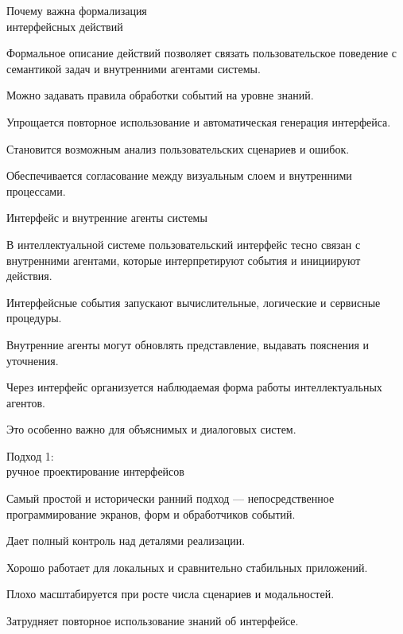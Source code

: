 \begin{frame}{Почему важна формализация\\ интерфейсных действий}
	\topline
	\justifying

	Формальное описание действий позволяет связать пользовательское поведение с семантикой задач и внутренними агентами системы.
	
	\begin{textitemize}
		\item Можно задавать правила обработки событий на уровне знаний.
		\item Упрощается повторное использование и автоматическая генерация интерфейса.
		\item Становится возможным анализ пользовательских сценариев и ошибок.
		\item Обеспечивается согласование между визуальным слоем и внутренними процессами.
	\end{textitemize}
\end{frame}

\begin{frame}{Интерфейс и внутренние агенты системы}
	\topline
	\justifying

	В интеллектуальной системе пользовательский интерфейс тесно связан с внутренними агентами, которые интерпретируют события и инициируют действия.
	
	\begin{textitemize}
		\item Интерфейсные события запускают вычислительные, логические и сервисные процедуры.
		\item Внутренние агенты могут обновлять представление, выдавать пояснения и уточнения.
		\item Через интерфейс организуется наблюдаемая форма работы интеллектуальных агентов.
		\item Это особенно важно для объяснимых и диалоговых систем.
	\end{textitemize}
\end{frame}

\begin{frame}{Подход 1:\\ ручное проектирование интерфейсов}
	\topline
	\justifying

	Самый простой и исторически ранний подход --- непосредственное программирование экранов, форм и обработчиков событий.
	
	\begin{textitemize}
		\item Дает полный контроль над деталями реализации.
		\item Хорошо работает для локальных и сравнительно стабильных приложений.
		\item Плохо масштабируется при росте числа сценариев и модальностей.
		\item Затрудняет повторное использование знаний об интерфейсе.
	\end{textitemize}
\end{frame}

